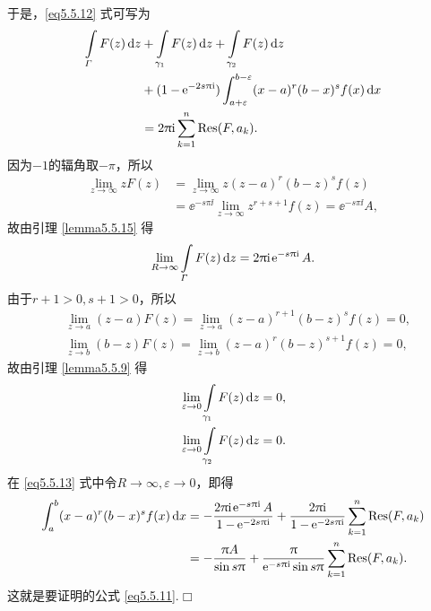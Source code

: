 于是，\eqref{eq5.5.12} 式可写为
\begin{equation}\label{eq5.5.13}
  \begin{aligned}
    \int\limits_\varGamma F(z)\mathop{}\!\mathrm dz&+\int\limits_{\gamma_1}F(z)\mathop{}\!\mathrm dz+\int\limits_{\gamma_2}F(z)\mathop{}\!\mathrm dz\\
    & + (1-\operatorname{\!\!\;\mathrm e}^{-2s\uppi\mathrm i})\int_{a+\varepsilon}^{b-\varepsilon}(x-a)^r(b-x)^sf(x)\mathop{}\!\mathrm dx\\
    & = 2\uppi\mathrm i\sum_{k=1}^n\operatorname*{Res}(F,a_k).
  \end{aligned}
\end{equation}
因为$-1$的辐角取$-\pi$，所以
\begin{align*}
  \lim_{z\to\infty}zF(z)&=\lim_{z\to\infty}z(z-a)^r(b-z)^sf(z)\\
  & = \ee^{-s\pi\ii}\lim_{z\to\infty}z^{r+s+1}f(z)=\ee^{-s\pi\ii}A,
\end{align*}
故由引理 \ref{lemma5.5.15} 得
\[
  \lim_{R\to\infty}\int\limits_{\varGamma}F(z)\mathop{}\!\mathrm dz = 2\uppi\mathrm i\operatorname{\!\!\;\mathrm e}^{-s\uppi\mathrm i}A.
\]
由于$r+1>0,s+1>0$，所以
\begin{align*}
  & \lim_{z\to a}(z-a)F(z) = \lim_{z\to a}(z-a)^{r+1}(b-z)^sf(z) = 0,\\
  & \lim_{z\to b}(b-z)F(z) = \lim_{z\to b}(z-a)^{r}(b-z)^{s+1}f(z) = 0,
\end{align*}
故由引理 \ref{lemma5.5.9} 得
\begin{align*}
  & \lim_{\varepsilon\to0}\int\limits_{\gamma_1}F(z)\mathop{}\!\mathrm dz = 0,\\
  & \lim_{\varepsilon\to0}\int\limits_{\gamma_2}F(z)\mathop{}\!\mathrm dz = 0.
\end{align*}
在 \eqref{eq5.5.13} 式中令$R\to\infty,\varepsilon\to0$，即得
\begin{align*}
  \int_a^b(x-a)^r(b-x)^sf(x)\dx&=-\frac{2\pi\ii\ee^{-s\pi\ii}A}{1-\ee^{-2s\pi\ii}}
  + \frac{2\pi\ii}{1-\ee^{-2s\pi\ii}}\sum_{k=1}^n\Res(F,a_k)\\
  & = -\frac{\pi A}{\sin s\pi}+\frac\pi{\ee^{-s\pi\ii}\sin
    s\pi}\sum_{k=1}^n\Res(F,a_k).
\end{align*}
这就是要证明的公式 \eqref{eq5.5.11}.\hfill$\Box$

